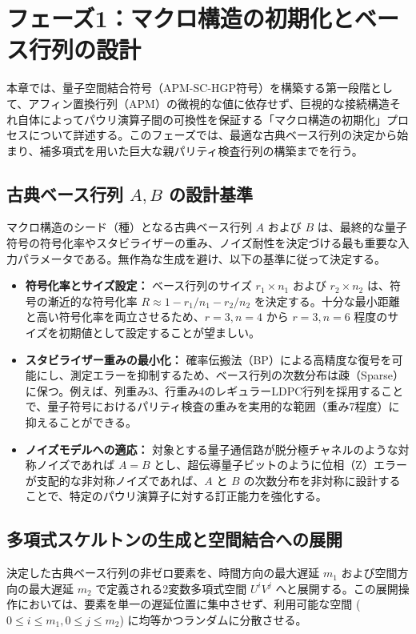 \documentclass[12pt]{article}
\begin{document}
\section{フェーズ1：マクロ構造の初期化とベース行列の設計}

本章では、量子空間結合符号（APM-SC-HGP符号）を構築する第一段階として、アフィン置換行列（APM）の微視的な値に依存せず、巨視的な接続構造それ自体によってパウリ演算子間の可換性を保証する「マクロ構造の初期化」プロセスについて詳述する。このフェーズでは、最適な古典ベース行列の決定から始まり、補多項式を用いた巨大な親パリティ検査行列の構築までを行う。

\subsection{古典ベース行列 $A, B$ の設計基準}
マクロ構造のシード（種）となる古典ベース行列 $A$ および $B$ は、最終的な量子符号の符号化率やスタビライザーの重み、ノイズ耐性を決定づける最も重要な入力パラメータである。無作為な生成を避け、以下の基準に従って決定する。

\begin{itemize}
    \item \textbf{符号化率とサイズ設定：} ベース行列のサイズ $r_1 \times n_1$ および $r_2 \times n_2$ は、符号の漸近的な符号化率 $R \approx 1 - r_1/n_1 - r_2/n_2$ を決定する。十分な最小距離と高い符号化率を両立させるため、$r=3, n=4$ から $r=3, n=6$ 程度のサイズを初期値として設定することが望ましい。
    \item \textbf{スタビライザー重みの最小化：} 確率伝搬法（BP）による高精度な復号を可能にし、測定エラーを抑制するため、ベース行列の次数分布は疎（Sparse）に保つ。例えば、列重み3、行重み4のレギュラーLDPC行列を採用することで、量子符号におけるパリティ検査の重みを実用的な範囲（重み7程度）に抑えることができる。
    \item \textbf{ノイズモデルへの適応：} 対象とする量子通信路が脱分極チャネルのような対称ノイズであれば $A = B$ とし、超伝導量子ビットのように位相（Z）エラーが支配的な非対称ノイズであれば、$A$ と $B$ の次数分布を非対称に設計することで、特定のパウリ演算子に対する訂正能力を強化する。
\end{itemize}

\subsection{多項式スケルトンの生成と空間結合への展開}
決定した古典ベース行列の非ゼロ要素を、時間方向の最大遅延 $m_1$ および空間方向の最大遅延 $m_2$ で定義される2変数多項式空間 $U^i V^j$ へと展開する。この展開操作においては、要素を単一の遅延位置に集中させず、利用可能な空間 ($0 \le i \le m_1, 0 \le j \le m_2$) に均等かつランダムに分散させる。
\end{document}
